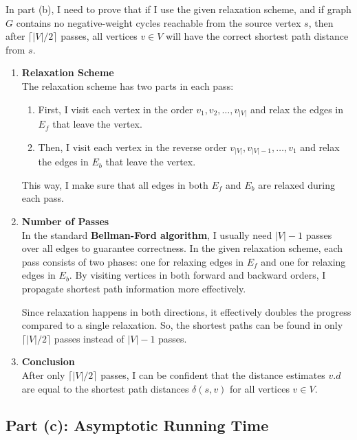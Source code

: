 \documentclass[10pt,letter,notitlepage]{article}
\begin{document}
\begin{Answer}
In part (b), I need to prove that if I use the given relaxation scheme, and if graph \( G \) contains no negative-weight cycles reachable from the source vertex \( s \), then after \(\lceil |V| / 2 \rceil\) passes, all vertices \( v \in V \) will have the correct shortest path distance from \( s \).

\begin{enumerate}
    \item \textbf{Relaxation Scheme} \\
    The relaxation scheme has two parts in each pass:
    \begin{enumerate}
        \item First, I visit each vertex in the order \( v_1, v_2, \ldots, v_{|V|} \) and relax the edges in \( E_f \) that leave the vertex.
        \item Then, I visit each vertex in the reverse order \( v_{|V|}, v_{|V|-1}, \ldots, v_1 \) and relax the edges in \( E_b \) that leave the vertex.
    \end{enumerate}
    This way, I make sure that all edges in both \( E_f \) and \( E_b \) are relaxed during each pass.

    \item \textbf{Number of Passes} \\
    In the standard \textbf{Bellman-Ford algorithm}, I usually need \( |V| - 1 \) passes over all edges to guarantee correctness.
    In the given relaxation scheme, each pass consists of two phases: one for relaxing edges in \( E_f \) and one for relaxing edges in \( E_b \). By visiting vertices in both forward and backward orders, I propagate shortest path information more effectively.

    Since relaxation happens in both directions, it effectively doubles the progress compared to a single relaxation. So, the shortest paths can be found in only \(\lceil |V| / 2 \rceil\) passes instead of \( |V| - 1 \) passes.

    \item \textbf{Conclusion} \\
    After only \(\lceil |V| / 2 \rceil\) passes, I can be confident that the distance estimates \( v.d \) are equal to the shortest path distances \(\delta(s, v)\) for all vertices \( v \in V \).
\end{enumerate}

\subsection*{Part (c): Asymptotic Running Time}


\end{Answer}
\end{document}

